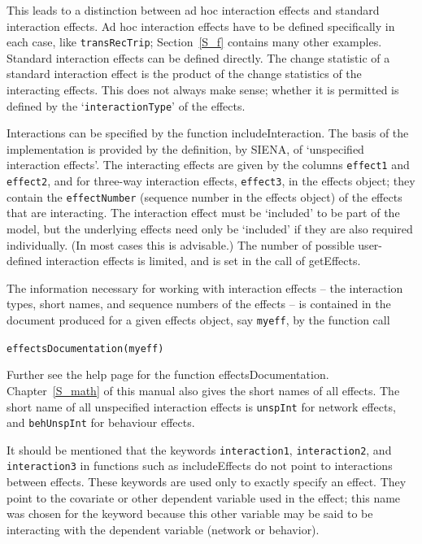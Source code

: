 \documentclass[a4paper,fleqn,11pt]{article}
\newcommand{\+}{\, + \,}
\newcommand{\sfn}[1]{\textsf{#1}}
\newcommand{\si}{{\sf SIENA}}
\begin{document}
This leads to a distinction between ad hoc interaction effects and standard
interaction effects.
Ad hoc interaction effects have to be defined specifically in each case,
like \texttt{transRecTrip}; Section~\ref{S_f} contains many other examples.
Standard interaction effects can be defined directly.
The change statistic of a standard interaction effect is the product of the
change statistics of the interacting effects.
This does not always make sense; whether it is permitted
is defined by the `\texttt{interactionType}' of the effects.

Interactions can be specified by the function \sfn{includeInteraction}.
The basis of the implementation is provided by the definition,
by \si, of `unspecified interaction effects'.
The interacting effects are given by
the columns \texttt{effect1} and \texttt{effect2},
and for three-way interaction effects, \texttt{effect3},
in the effects object; they contain the \texttt{effectNumber}
(sequence number in the effects object) of the effects that are interacting.
The interaction effect must be `included' to be part of the model,
but the underlying effects need only be `included' if
they are also required individually.
(In most cases this is advisable.)
The number of possible user-defined interaction effects is limited,
and is set in the call of \sfn{getEffects}.
\medskip

The information necessary for working with interaction effects
-- the interaction types, short names, and sequence numbers
of the effects -- is contained in the document produced
for a given effects object, say \texttt{myeff}, by the function call

\verb|effectsDocumentation(myeff)|

\noindent
Further see the help page for the function \sfn{effectsDocumentation}.
Chapter~\ref{S_math} of this manual also gives the short names of all effects.
The short name of all unspecified interaction effects is \texttt{unspInt}
for network effects, and \texttt{behUnspInt} for behaviour effects.

It should be mentioned that the keywords \texttt{interaction1},
\texttt{interaction2}, and \texttt{interaction3} in functions such as
\sfn{includeEffects} do not point to interactions between effects.
These keywords are used only to exactly specify an effect.
They point to the covariate or other dependent variable used in the effect;
this name was chosen for the keyword because this other variable may
be said to be interacting with the dependent variable (network or behavior).
\end{document}
